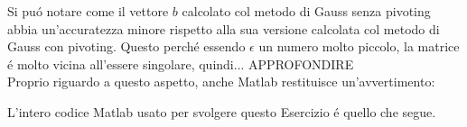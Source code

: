\noindent Si pu\'o notare come il vettore \(b\) calcolato col metodo di Gauss senza pivoting abbia un'accuratezza minore rispetto alla sua versione calcolata col metodo di Gauss con pivoting. Questo perch\'e essendo \(\epsilon\) un numero molto piccolo, la matrice \'e molto vicina all'essere singolare, quindi... APPROFONDIRE
\\

\noindent Proprio riguardo a questo aspetto, anche Matlab restituisce un'avvertimento:


\noindent L'intero codice Matlab usato per svolgere questo Esercizio \'e quello che segue.



